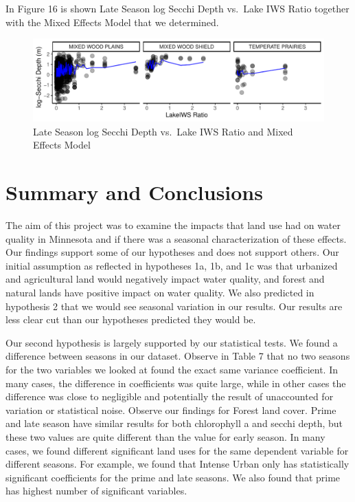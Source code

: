 \documentclass[12pt,]{article}
\begin{document}
In Figure 16 is shown Late Season log Secchi Depth vs.~Lake IWS Ratio
together with the Mixed Effects Model that we determined.

\begin{figure}
\centering
\includegraphics{Bollt_Greif_Raby_Roth_Project_Final_files/figure-latex/unnamed-chunk-34-1.pdf}
\caption{Late Season log Secchi Depth vs.~Lake IWS Ratio and Mixed
Effects Model}
\end{figure}

\newpage

\hypertarget{summary-and-conclusions}{%
\section{Summary and Conclusions}\label{summary-and-conclusions}}

The aim of this project was to examine the impacts that land use had on
water quality in Minnesota and if there was a seasonal characterization
of these effects. Our findings support some of our hypotheses and does
not support others. Our initial assumption as reflected in hypotheses
1a, 1b, and 1c was that urbanized and agricultural land would negatively
impact water quality, and forest and natural lands have positive impact
on water quality. We also predicted in hypothesis 2 that we would see
seasonal variation in our results. Our results are less clear cut than
our hypotheses predicted they would be.

Our second hypothesis is largely supported by our statistical tests. We
found a difference between seasons in our dataset. Observe in Table 7
that no two seasons for the two variables we looked at found the exact
same variance coefficient. In many cases, the difference in coefficients
was quite large, while in other cases the difference was close to
negligible and potentially the result of unaccounted for variation or
statistical noise. Observe our findings for Forest land cover. Prime and
late season have similar results for both chlorophyll a and secchi
depth, but these two values are quite different than the value for early
season. In many cases, we found different significant land uses for the
same dependent variable for different seasons. For example, we found
that Intense Urban only has statistically significant coefficients for
the prime and late seasons. We also found that prime has highest number
of significant variables.
\end{document}
